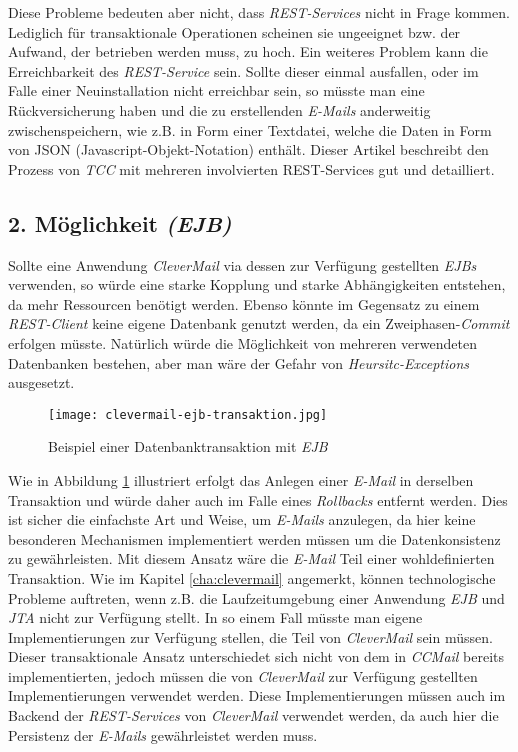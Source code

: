 \newline
\newline
Diese Probleme bedeuten aber nicht, dass \emph{REST-Services} nicht in Frage kommen. Lediglich für transaktionale Operationen scheinen sie ungeeignet bzw. der Aufwand, der betrieben werden muss, zu hoch. Ein weiteres Problem kann die Erreichbarkeit des \emph{REST-Service} sein. Sollte dieser einmal ausfallen, oder im Falle einer Neuinstallation nicht erreichbar sein, so müsste man eine Rückversicherung haben und die zu erstellenden \emph{E-Mails} anderweitig zwischenspeichern, wie z.B. in Form einer Textdatei, welche die Daten in Form von JSON (Javascript-Objekt-Notation) enthält.
\newline
\newline
Dieser Artikel \cite{atomikosTcc} beschreibt den Prozess von \emph{TCC} mit mehreren involvierten REST-Services gut und detailliert.

\subsection{2. Möglichkeit \emph{(EJB)}}
Sollte eine Anwendung \emph{CleverMail} via dessen zur Verfügung gestellten \emph{EJBs} verwenden, so würde eine starke Kopplung und starke Abhängigkeiten entstehen, da mehr Ressourcen benötigt werden. Ebenso könnte im Gegensatz zu einem \emph{REST-Client} keine eigene Datenbank genutzt werden, da ein Zweiphasen-\emph{Commit} erfolgen müsste. Natürlich würde die Möglichkeit von mehreren verwendeten Datenbanken bestehen, aber man wäre der Gefahr von \emph{Heursitc-Exceptions} ausgesetzt.
\newpage
\begin{figure}[h]
\centering
\texttt{[image: clevermail-ejb-transaktion.jpg]} %
\caption{Beispiel einer Datenbanktransaktion mit \emph{EJB}}
\label{fig:clevermail-rest-tcc}
\end{figure}
Wie in Abbildung \ref{fig:clevermail-rest-tcc} illustriert erfolgt das Anlegen einer \emph{E-Mail} in derselben Transaktion und würde daher auch im Falle eines \emph{Rollbacks} entfernt werden. Dies ist sicher die einfachste Art und Weise, um \emph{E-Mails} anzulegen, da hier keine besonderen Mechanismen implementiert werden müssen um die Datenkonsistenz zu gewährleisten. Mit diesem Ansatz wäre die \emph{E-Mail} Teil einer wohldefinierten Transaktion.
\newline
\newline
Wie im Kapitel \ref{cha:clevermail} angemerkt, können technologische Probleme auftreten, wenn z.B. die Laufzeitumgebung einer Anwendung \emph{EJB} und \emph{JTA} nicht zur Verfügung stellt. In so einem Fall müsste man eigene Implementierungen zur Verfügung stellen, die Teil von \emph{CleverMail} sein müssen.
\newline
\newline
Dieser transaktionale Ansatz unterschiedet sich nicht von dem in \emph{CCMail} bereits implementierten, jedoch müssen die von \emph{CleverMail} zur Verfügung gestellten Implementierungen verwendet werden. Diese Implementierungen müssen auch im Backend der \emph{REST-Services} von \emph{CleverMail} verwendet werden, da auch hier die Persistenz der \emph{E-Mails} gewährleistet werden muss.
 
